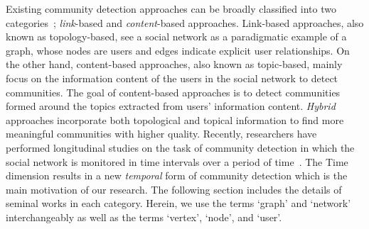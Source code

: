 \documentclass[sigconf]{acmart}
\begin{document}
Existing community detection approaches can be broadly classified into two categories~\cite{FORTUNATO201075}; \textit{link}-based and \textit{content}-based approaches. Link-based approaches, also known as topology-based, see a social network as a paradigmatic example of a graph, whose nodes are users and edges indicate explicit user relationships. On the other hand, content-based approaches, also known as topic-based, mainly focus on the information content of the users in the social network to detect communities. The goal of content-based approaches is to detect communities formed around the topics extracted from users' information content. \textit{Hybrid} approaches incorporate both topological and topical information to find more meaningful communities with higher quality. Recently, researchers have performed longitudinal studies on the task of community detection in which the social network is monitored in time intervals over a period of time~\cite{DBLP:conf/aaai/HuYC14,DBLP:conf/sigmod/HuYCX15,DBLP:journals/tois/LiangRZMYR17}. The Time dimension results in a new \textit{temporal} form of community detection which is the main motivation of our research. The following section includes the details of seminal works in each category. Herein, we use the terms `graph' and `network' interchangeably as well as the terms `vertex', `node', and `user'.
\end{document}
